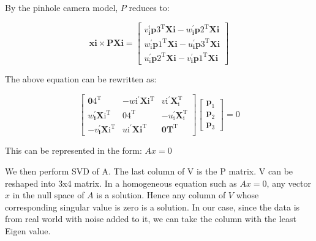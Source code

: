 \documentclass[a4paper, 10pt]{article}
\begin{document}
\begin{multicols}{2}
		
		
		By the pinhole camera model, $P$ reduces to:
		
		\[
		\mathbf{x}{\mathbf{i}} \times \mathbf{P} \mathbf{X}{\mathbf{i}}=\left[\begin{array}{l}
		v_{\mathbf{i}}^{\mathrm{i}} \mathbf{p}{3}^{\mathrm{T}} \mathbf{X}{\mathbf{i}}-w_{\mathbf{i}}^{\prime} \mathbf{p}{2}^{\mathrm{T}} \mathbf{X}{\mathbf{i}} \\
		w_{\mathrm{i}}^{\prime} \mathbf{p}{1}^{\mathrm{T}} \mathbf{X}{\mathbf{i}}-u_{\mathbf{i}}^{\prime} \mathbf{p}{3}^{\mathrm{T}} \mathbf{X}{\mathbf{i}} \\
		u_{\mathrm{i}}^{\prime} \mathbf{p}{2}^{\mathrm{T}} \mathbf{X}{\mathbf{i}}-v_{\mathbf{i}}^{\prime} \mathbf{p}{1}^{\mathrm{T}} \mathbf{X}{\mathbf{i}}
		\end{array}\right]
		\]
		
		
		The above equation can be rewritten as:
		
		\[
		\left[\begin{array}{ccc}
		\mathbf{0}{4}^{\mathrm{T}} & -w{\mathrm{i}}^{\prime} \mathbf{X}{\mathrm{i}}^{\mathrm{T}} & v{\mathrm{i}}^{\prime} \mathbf{X}_{\mathrm{i}}^{\mathrm{T}} \\
		w_{\mathbf{i}}^{\prime} \mathbf{X}{\mathrm{i}}^{\mathrm{T}} & 0{4}^{\mathrm{T}} & -u_{\mathrm{i}}^{\prime} \mathbf{X}_{\mathrm{i}}^{\mathrm{T}} \\
		-v_{\mathbf{i}}^{\prime} \mathbf{X}{\mathrm{i}}^{\mathrm{T}} & u{\mathrm{i}}^{\prime} \mathbf{X}{\mathbf{i}}^{\mathrm{T}} & \mathbf{0}{\mathbf{T}}^{\mathrm{T}}
		\end{array}\right]\left[\begin{array}{l}
		\mathbf{p}_{1} \\
		\mathbf{p}_{2} \\
		\mathbf{p}_{3}
		\end{array}\right]=0		
		\]
		
		This can be represented in the form:
		$Ax=0$
		
		
		
		We then perform SVD of A. The last column of V is the P matrix. V can be reshaped into 3x4 matrix. In a homogeneous equation such as $Ax=0$, any vector $x$ in the null space of $A$ is a solution. Hence any column of $V$ whose corresponding singular value is zero is a solution. In our case, since the data is from real world with noise added to it, we can take the column with the least Eigen value. 
		
		
		

\end{multicols}
\end{document}
